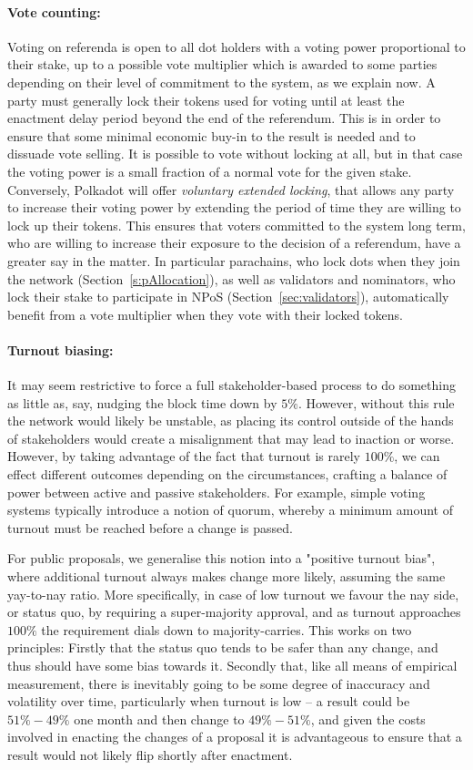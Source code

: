 \paragraph{Vote counting:} Voting on referenda is open to all dot holders with a voting power proportional to their stake, up to a possible vote multiplier which is awarded to some parties depending on their level of commitment to the system, as we explain now. A party must generally lock their tokens used for voting until at least the enactment delay period beyond the end of the referendum. This is in order to ensure that some minimal economic buy-in to the result is needed and to dissuade vote selling. It is possible to vote without locking at all, but in that case the voting power is a small fraction of a normal vote for the given stake. Conversely, Polkadot will offer \emph{voluntary extended locking}, that allows any party to increase their voting power by extending the period of time they are willing to lock up their tokens. This ensures that voters committed to the system long term, who are willing to increase their exposure to the decision of a referendum, have a greater say in the matter. In particular parachains, who lock dots when they join the network (Section~\ref{s:pAllocation}), as well as validators and nominators, who lock their stake to participate in NPoS (Section~\ref{sec:validators}), automatically benefit from a vote multiplier when they vote with their locked tokens.

\paragraph{Turnout biasing:} It may seem restrictive to force a full stakeholder-based process to do something as little as, say, nudging the block time down by $5\%$. However, without this rule the network would likely be unstable, as placing its control outside of the hands of stakeholders would create a misalignment that may lead to inaction or worse. However, by taking advantage of the fact that turnout is rarely $100\%$, we can effect different outcomes depending on the circumstances, crafting a balance of power between active and passive stakeholders. For example, simple voting systems typically introduce a notion of quorum, whereby a minimum amount of turnout must be reached before a change is passed. 

For public proposals, we generalise this notion into a "positive turnout bias", where additional turnout always makes change more likely, assuming the same yay-to-nay ratio. More specifically, in case of low turnout we favour the nay side, or status quo, by requiring a super-majority approval, and as turnout approaches $100\%$ the requirement dials down to majority-carries. This works on two principles: Firstly that the status quo tends to be safer than any change, and thus should have some bias towards it. Secondly that, like all means of empirical measurement, there is inevitably going to be some degree of inaccuracy and volatility over time, particularly when turnout is low -- a result could be $51\%-49\%$ one month and then change to $49\%-51\%$, and given the costs involved in enacting the changes of a proposal it is advantageous to ensure that a result would not likely flip shortly after enactment. 

